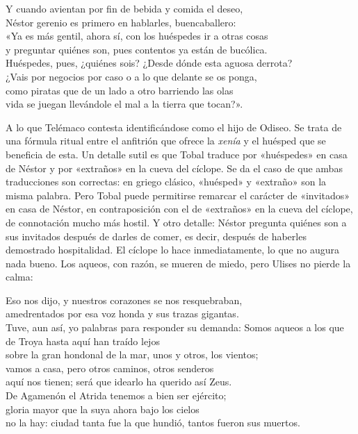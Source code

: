 \begin{versocita}
Y cuando avientan por fin de bebida y comida el deseo,\\
Néstor gerenio es primero en hablarles, buencaballero:\\
«Ya es más gentil, ahora sí, con los huéspedes ir a otras cosas\\
y preguntar quiénes son, pues contentos ya están de bucólica.\\
Huéspedes, pues, ¿quiénes sois? ¿Desde dónde esta aguosa derrota?\\
¿Vais por negocios por caso o a lo que delante se os ponga,\\
como piratas que de un lado a otro barriendo las olas\\
vida se juegan llevándole el mal a la tierra que tocan?».
\end{versocita}

A lo que Telémaco contesta identificándose como el hijo de Odiseo. Se trata de una fórmula ritual entre el anfitrión que ofrece la \emph{xenía} y el huésped que se beneficia de esta. Un detalle sutil es que Tobal traduce  por «huéspedes» en casa de Néstor y por «extraños» en la cueva del cíclope. Se da el caso de que ambas traducciones son correctas: en griego clásico, «huésped» y «extraño» son la misma palabra. Pero Tobal puede permitirse remarcar el carácter de «invitados» en casa de Néstor, en contraposición con el de «extraños» en la cueva del cíclope, de connotación mucho más hostil. Y otro detalle: Néstor pregunta quiénes son a sus invitados después de darles de comer, es decir, después de haberles demostrado hospitalidad. El cíclope lo hace inmediatamente, lo que no augura nada bueno. Los aqueos, con razón, se mueren de miedo, pero Ulises no pierde la calma:

\begin{versocita}
Eso nos dijo, y nuestros corazones se nos resquebraban,\\
amedrentados por esa voz honda y sus trazas gigantas.\\
Tuve, aun así, yo palabras para responder su demanda:
\stanzabreak
Somos aqueos a los que de Troya hasta aquí han traído lejos\\
sobre la gran hondonal de la mar, unos y otros, los vientos;\\
vamos a casa, pero otros caminos, otros senderos\\
aquí nos tienen; será que idearlo ha querido así Zeus.\\
De Agamenón el Atrida tenemos a bien ser ejército;\\
gloria mayor que la suya ahora bajo los cielos\\
no la hay: ciudad tanta fue la que hundió, tantos fueron sus muertos.
\end{versocita}

